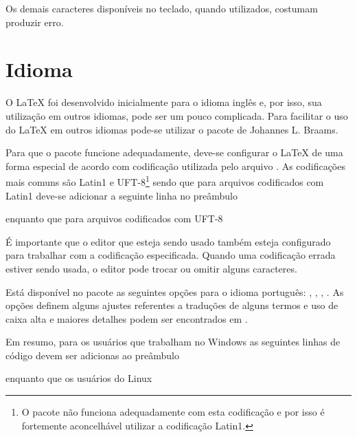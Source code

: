 Os demais caracteres disponíveis no teclado, quando utilizados, costumam produzir erro.

\section{Idioma} \label{sss:latex:babel}
O LaTeX foi desenvolvido inicialmente para o idioma inglês e, por isso, sua utilização em outros idiomas, pode ser um pouco complicada. Para facilitar o uso do LaTeX em outros idiomas pode-se utilizar o pacote  de Johannes L. Braams.

Para que o pacote  funcione adequadamente, deve-se configurar o LaTeX de uma forma especial de acordo com codificação utilizada pelo arquivo . As codificações mais comuns são Latin1 e UFT-8\footnote{O pacote  não funciona adequadamente com esta codificação e por isso é fortemente aconcelhável utilizar a codificação Latin1.} sendo que para arquivos codificados com Latin1 deve-se adicionar a seguinte linha no preâmbulo
\begin{latexcode}
    \usepackage[latin1]{inputenc}
\end{latexcode}
enquanto que para arquivos codificados com UFT-8
\begin{latexcode}
    \usepackage[utf8]{inputenc}
\end{latexcode}

É importante que o editor que esteja sendo usado também esteja configurado para trabalhar com a codificação especificada. Quando uma codificação errada estiver sendo usada, o editor pode trocar ou omitir alguns caracteres.

Está disponível no pacote  as seguintes opções para o idioma português: , , , . As opções definem alguns ajustes referentes a traduções de alguns termos e uso de caixa alta e maiores detalhes podem ser encontrados em \cite{Braams:2008:Babel}.

Em resumo, para os usuários que trabalham no Windows as seguintes linhas de código devem ser adicionas ao preâmbulo
\begin{latexcode}
    \usepackage[latin1]{inputenc}
    \usepackage[brazil]{babel}
\end{latexcode}
enquanto que os usuários do Linux
\begin{latexcode}
    \usepackage[utf8]{inputenc}
    \usepackage[brazil]{babel}
\end{latexcode}

